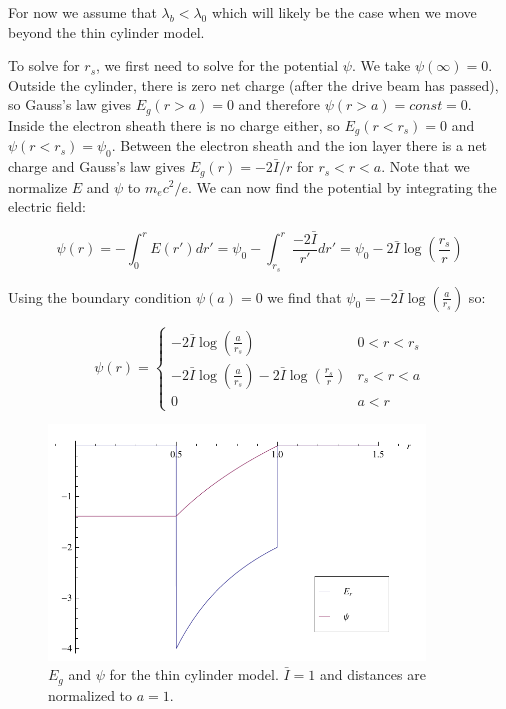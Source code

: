 \documentclass[aps,prl,preprint,groupedaddress]{revtex4-1}
\begin{document}
For now we assume that $ \lambda_b < \lambda_0 $ which will likely be the case when we move beyond the thin cylinder model.

To solve for $r_s$, we first need to solve for the potential $\psi$. We take $\psi(\infty) = 0$. Outside the cylinder, there is zero net charge (after the drive beam has passed), so Gauss's law gives $E_g(r > a) = 0$ and therefore $\psi(r > a) = const = 0$. Inside the electron sheath there is no charge either, so $E_g(r < r_s) = 0$ and $\psi(r < r_s) = \psi_0$. Between the electron sheath and the ion layer there is a net charge and Gauss's law gives $E_g(r) = -2\bar{I}/r$ for $r_s < r < a$. Note that we normalize $E$ and $\psi$ to $m_e c^2/e$. We can now find the potential by integrating the electric field:

\begin{equation}\label{eq:thin_psi}
\psi(r) = -\int_0^r E(r') dr' = \psi_0 - \int_{r_s}^r \frac{-2\bar{I}}{r'}dr' = \psi_0 - 2\bar{I} \log\left(\frac{r_s}{r}\right)
\end{equation}

Using the boundary condition $\psi(a) = 0$ we find that $\psi_0 = -2\bar{I} \log\left(\frac{a}{r_s}\right)$ so:

\begin{equation}\label{eq:psi_everywhere}
\psi(r) = \left\{ \begin{array}{lr}
-2\bar{I} \log\left(\frac{a}{r_s}\right) & 0<r<r_s \\
-2\bar{I} \log\left(\frac{a}{r_s}\right) - 2\bar{I} \log\left(\frac{r_s}{r}\right) & r_s<r<a \\
0 & a<r
\end{array} \right.
\end{equation}

\begin{figure}[ht]\label{fig:fields}
  \centering
    \includegraphics[width=100mm]{./figures/fields.pdf}
      \caption{$E_g$ and $\psi$ for the thin cylinder model. $\bar{I} = 1$ and distances are normalized to $a=1$.}
\end{figure}
\end{document}
